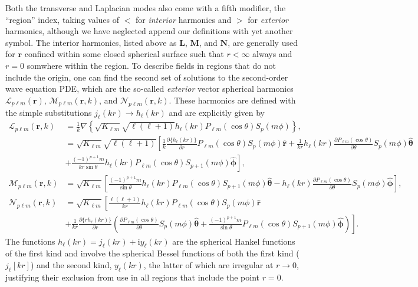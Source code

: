 \documentclass{article}
\begin{document}
Both the transverse and Laplacian modes also come with a fifth modifier, the ``region'' index, taking values of $<$ for \textit{interior} harmonics and $>$ for \textit{exterior} harmonics, although we have neglected append our definitions with yet another symbol. The interior harmonics, listed above as $\mathbf{L}$, $\mathbf{M}$, and $\mathbf{N}$, are generally used for $\mathbf{r}$ confined within some closed spherical surface such that $r<\infty$ always and $r = 0$ somwhere within the region. To describe fields in regions that do not include the origin, one can find the second set of solutions to the second-order wave equation PDE, which are the so-called \textit{exterior} vector spherical harmonics $\bm{\mathcal{L}}_{p\ell m}(\mathbf{r})$, $\bm{\mathcal{M}}_{p\ell m}(\mathbf{r},k)$, and $\bm{\mathcal{N}}_{p\ell m}(\mathbf{r},k)$. These harmonics are defined with the simple substitutions $j_\ell(kr)\to h_\ell(kr)$ and are explicitly given by
\begin{equation}
\begin{split}
\bm{\mathcal{L}}_{p\ell m}(\mathbf{r},k) &= \frac{1}{k}\nabla\left\{\sqrt{K_{\ell m}}\sqrt{\ell(\ell + 1)}h_\ell(kr)P_{\ell m}(\cos\theta)S_p(m\phi)\right\},\\
&= \sqrt{K_{\ell m}}\sqrt{\ell(\ell + 1)}\left[\frac{1}{k}\frac{\partial\{h_\ell(kr)\}}{\partial r}P_{\ell m}(\cos\theta)S_p(m\phi)\hat{\mathbf{r}} + \frac{1}{kr}h_\ell(kr)\frac{\partial P_{\ell m}(\cos\theta)}{\partial\theta}S_p(m\phi)\hat{\bm{\theta}}\right.\\
&\left. + \frac{(-1)^{p+1}m}{kr\sin\theta}h_\ell(kr)P_{\ell m}(\cos\theta)S_{p+1}(m\phi)\hat{\bm{\phi}}\right],\\[1.0em]
\bm{\mathcal{M}}_{p\ell m}(\mathbf{r},k) &= \sqrt{K_{\ell m}}\left[\frac{(-1)^{p + 1}m}{\sin\theta}h_\ell(kr)P_{\ell m}(\cos\theta)S_{p+1}(m\phi)\hat{\bm{\theta}} - h_\ell(kr)\frac{\partial P_{\ell m}(\cos\theta)}{\partial\theta}S_p(m\phi)\hat{\bm{\phi}}\right],\\[0.5em]
\bm{\mathcal{N}}_{p\ell m}(\mathbf{r},k) &= \sqrt{K_{\ell m}}\left[\frac{\ell(\ell + 1)}{kr}h_\ell(kr)P_{\ell m}(\cos\theta)S_p(m\phi)\hat{\mathbf{r}}\right.\\
&+ \left.\frac{1}{kr}\frac{\partial\{rh_\ell(kr)\}}{\partial r}\left(\frac{\partial P_{\ell m}(\cos\theta)}{\partial\theta}S_p(m\phi)\hat{\bm{\theta}} + \frac{(-1)^{p+1}m}{\sin\theta}P_{\ell m}(\cos\theta)S_{p + 1}(m\phi)\hat{\bm{\phi}}\right)\right].
\end{split}
\end{equation}
The functions $h_\ell(kr) = j_\ell(kr) + \mathrm{i}y_\ell(kr)$ are the spherical Hankel functions of the first kind and involve the spherical Bessel functions of both the first kind ($j_\ell[kr]$) and the second kind, $y_\ell(kr)$, the latter of which are irregular at $r\to0$, justifying their exclusion from use in all regions that include the point $r = 0$.
\end{document}
